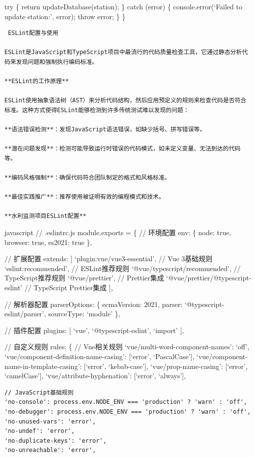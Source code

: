 {{try \{ return updateDatabase(station); \} catch (error) \{ console.error(`Failed to update station:', error); throw error; \} \}

\begin{lstlisting}
 ESLint配置与使用

ESLint是JavaScript和TypeScript项目中最流行的代码质量检查工具，它通过静态分析代码来发现问题和强制执行编码标准。

**ESLint的工作原理**

ESLint使用抽象语法树（AST）来分析代码结构，然后应用预定义的规则来检查代码是否符合标准。这种方式使得ESLint能够检测到许多传统测试难以发现的问题：

**语法错误检测**：发现JavaScript语法错误，如缺少括号、拼写错误等。

**潜在问题发现**：检测可能导致运行时错误的代码模式，如未定义变量、无法到达的代码等。

**编码风格强制**：确保代码符合团队制定的格式和风格标准。

**最佳实践推广**：推荐使用被证明有效的编程模式和技术。

**水利监测项目ESLint配置**
\end{lstlisting}

javascript // .eslintrc.js module.exports = \{ // 环境配置 env: \{ node: true, browser: true, es2021: true \},

// 扩展配置 extends: {[} `plugin:vue/vue3-essential', // Vue 3基础规则 `eslint:recommended', // ESLint推荐规则 `@vue/typescript/recommended', // TypeScript推荐规则 `@vue/prettier', // Prettier集成 `@vue/prettier/@typescript-eslint' // TypeScript Prettier集成 {]},

// 解析器配置 parserOptions: \{ ecmaVersion: 2021, parser: `@typescript-eslint/parser', sourceType: `module' \},

// 插件配置 plugins: {[} `vue', `@typescript-eslint', `import' {]},

// 自定义规则 rules: \{ // Vue相关规则 `vue/multi-word-component-names': `off', `vue/component-definition-name-casing': {[}`error', `PascalCase'{]}, `vue/component-name-in-template-casing': {[}`error', `kebab-case'{]}, `vue/prop-name-casing': {[}`error', `camelCase'{]}, `vue/attribute-hyphenation': {[}`error', `always'{]},

\begin{verbatim}
// JavaScript基础规则
'no-console': process.env.NODE_ENV === 'production' ? 'warn' : 'off',
'no-debugger': process.env.NODE_ENV === 'production' ? 'warn' : 'off',
'no-unused-vars': 'error',
'no-undef': 'error',
'no-duplicate-keys': 'error',
'no-unreachable': 'error',


\end{verbatim}}}
